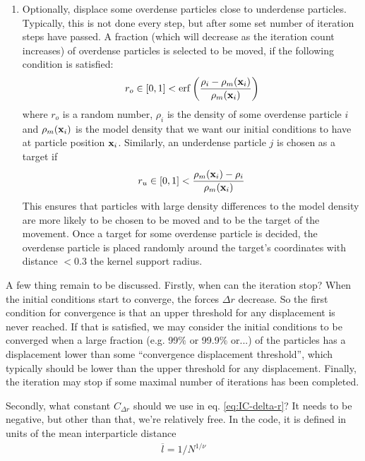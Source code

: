 \begin{enumerate}
	\item Optionally, displace some overdense particles close to underdense particles. 
		Typically, this is not done every step, but after some set number of iteration steps have passed.
		A fraction (which will decrease as the iteration count increases) of overdense particles is selected to be moved, if the following condition is satisfied:
		\begin{equation}
			r_{o} \in [0, 1] < \mathrm{erf}\left( \frac{\rho_i - \rho_m(\mathbf{x}_i)}{\rho_m(\mathbf{x}_i)}\right)
		\end{equation}
		where $r_{o}$ is a random number, $\rho_i$ is the density of some overdense particle $i$ and $\rho_m(\mathbf{x}_i)$ is the model density that we want our initial conditions to have at particle position $\mathbf{x}_i$.
		Similarly, an underdense particle $j$ is chosen as a target if
		\begin{equation}
			r_{u} \in [0, 1] <  \frac{\rho_m(\mathbf{x}_i) - \rho_i}{\rho_m(\mathbf{x}_i)}
		\end{equation} 
		This ensures that particles with large density differences to the model density are more likely to be chosen to be moved and to be the target of the movement.
		Once a target for some overdense particle is decided, the overdense particle is placed randomly around the target's coordinates with distance $< 0.3$ the kernel support radius.
		
\end{enumerate}



A few thing remain to be discussed.
Firstly, when can the iteration stop?
When the initial conditions start to converge, the forces $\Delta r$ decrease.
So the first condition for convergence is that an upper threshold for any displacement is never reached.
If that is satisfied, we may consider the initial conditions to be converged when a large fraction (e.g. 99$\%$ or 99.9$\%$ or...) of the particles has a displacement lower than some ``convergence displacement threshold'', which typically should be lower than the upper threshold for any displacement.
Finally, the iteration may stop if some maximal number of iterations has been completed.

Secondly, what constant $C_{\Delta r}$ should we use in eq. \ref{eq:IC-delta-r}?
It needs to be negative, but other than that, we're relatively free.
In the code, it is defined in units of the mean interparticle distance
\begin{align}
	\overline{l} = 1 / N^{1/\nu}
\end{align}

